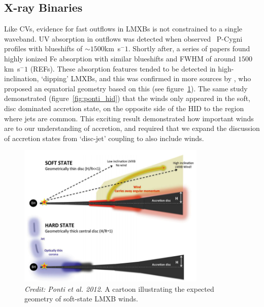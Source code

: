\subsection{X-ray Binaries}
\label{sec:xrb_winds}

Like CVs, evidence for fast outflows in LMXBs is not constrained to 
a single waveband. UV absorption in outflows was detected when
\cite{ioannau2003} observed \civfull\ P-Cygni profiles with blueshifts 
of $\sim1500$km~s$^-1$. Shortly after, a series of papers found 
highly ionized Fe absorption with similar blueshifts and FWHM of around 
$1500$km~s$^-1$ (REFs). These absorption features tended to be detected
in high-inclination, `dipping' LMXBs, and this was confirmed in more sources
by \cite{ponti2012}, who proposed an equatorial geometry based on this (see 
figure~\ref{fig:ponti_cartoon}). 
The same study demonstrated (figure~\ref{fig:ponti_hid}) that
the winds only appeared in the soft, 
disc dominated accretion state, on the opposite side of the HID to the
region where jets are common. This exciting result demonstrated how
important winds are to our understanding of accretion, and required that
we expand the discussion of accretion states from `disc-jet' coupling
to also include winds.

\begin{figure}
\centering
\includegraphics[width=0.8\textwidth]{figures/01-intro/ponti_wind_cartoon.png}
\caption
{
{\sl Credit: Ponti et al. 2012}. 
A cartoon illustrating the expected geometry of soft-state LMXB winds.
} 
\label{fig:ponti_cartoon}
\end{figure}


